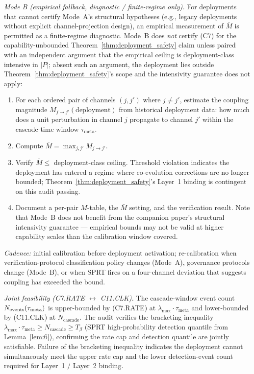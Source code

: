 \emph{Mode B (empirical fallback, diagnostic / finite-regime
only).}  For deployments that cannot certify Mode~A's structural
hypotheses (e.g., legacy deployments without explicit
channel-projection design), an empirical measurement of $\bar{M}$
is permitted as a finite-regime diagnostic. Mode~B does
\emph{not} certify (C7) for the capability-unbounded
Theorem~\ref{thm:deployment_safety} claim unless paired with an
independent argument that the empirical ceiling is deployment-class
intensive in $|P|$; absent such an argument, the deployment lies
outside Theorem~\ref{thm:deployment_safety}'s scope and the
intensivity guarantee does not apply:
\begin{enumerate}
\item For each ordered pair of channels $(j, j')$ where $j \neq
  j'$, estimate the coupling magnitude
  $M_{j \to j'}(\mathrm{deployment})$ from historical deployment
  data: how much does a unit perturbation in channel $j$ propagate
  to channel $j'$ within the cascade-time window
  $\tau_{\mathrm{meta}}$.
\item Compute $\bar{M} = \max_{j, j'} M_{j \to j'}$.
\item Verify $\bar{M} \leq$ deployment-class ceiling.  Threshold
  violation indicates the deployment has entered a regime where
  co-evolution corrections are no longer bounded;
  Theorem~\ref{thm:deployment_safety}'s Layer~1 binding is
  contingent on this audit passing.
\item Document a per-pair $M$-table, the $\bar{M}$ setting, and
  the verification result.  Note that Mode~B does not benefit
  from the companion paper's structural intensivity guarantee
  --- empirical bounds may not be valid at higher capability
  scales than the calibration window covered.
\end{enumerate}

\emph{Cadence:} initial calibration before deployment activation;
re-calibration when verification-protocol classification policy
changes (Mode~A), governance protocols change (Mode~B), or when
SPRT fires on a four-channel deviation that suggests coupling
has exceeded the bound.

\emph{Joint feasibility (C7.RATE $\leftrightarrow$ C11.CLK).}
The cascade-window event count $N_{\mathrm{events}}(\tau_{\mathrm{meta}})$ is
upper-bounded by (C7.RATE) at $\lambda_{\max} \cdot
\tau_{\mathrm{meta}}$ and lower-bounded by (C11.CLK) at
$N_{\mathrm{cascade}}$. The audit verifies the bracketing
inequality
$\lambda_{\max} \cdot \tau_{\mathrm{meta}} \geq N_{\mathrm{cascade}} \geq T_\beta$
(SPRT high-probability detection quantile from
Lemma~\ref{lem:6}), confirming the rate cap and detection
quantile are jointly satisfiable. Failure of the bracketing
inequality indicates the deployment cannot simultaneously meet
the upper rate cap and the lower detection-event count required
for Layer~1 / Layer~2 binding.

